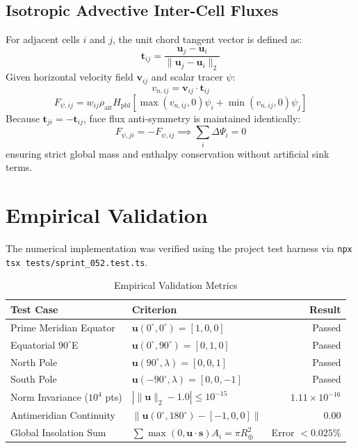 \documentclass[10pt,journal,compsoc]{IEEEtran}
\begin{document}
\subsection{Isotropic Advective Inter-Cell Fluxes}
For adjacent cells $i$ and $j$, the unit chord tangent vector is defined as:
\begin{equation}
\mathbf{t}_{ij} = \frac{\mathbf{u}_j - \mathbf{u}_i}{\|\mathbf{u}_j - \mathbf{u}_i\|_2}
\end{equation}
Given horizontal velocity field $\mathbf{v}_{ij}$ and scalar tracer $\psi$:
\begin{equation}
v_{n, ij} = \mathbf{v}_{ij} \cdot \mathbf{t}_{ij}
\end{equation}
\begin{equation}
F_{\psi, ij} = w_{ij} \rho_{\text{air}} H_{\text{pbl}} \left[ \max(v_{n, ij}, 0)\psi_i + \min(v_{n, ij}, 0)\psi_j \right]
\end{equation}
Because $\mathbf{t}_{ji} = -\mathbf{t}_{ij}$, face flux anti-symmetry is maintained identically:
\begin{equation}
F_{\psi, ji} = -F_{\psi, ij} \implies \sum_{i} \Delta \Psi_i = 0
\end{equation}
ensuring strict global mass and enthalpy conservation without artificial sink terms.

\section{Empirical Validation}
The numerical implementation was verified using the project test harness via \texttt{npx tsx tests/sprint\_052.test.ts}.

\begin{table}[htbp]
\caption{Empirical Validation Metrics}
\centering
\begin{tabular}{llr}
\toprule
\textbf{Test Case} & \textbf{Criterion} & \textbf{Result} \\
\midrule
Prime Meridian Equator & $\mathbf{u}(0^\circ, 0^\circ) = [1, 0, 0]$ & Passed \\
Equatorial $90^\circ$E & $\mathbf{u}(0^\circ, 90^\circ) = [0, 1, 0]$ & Passed \\
North Pole & $\mathbf{u}(90^\circ, \lambda) = [0, 0, 1]$ & Passed \\
South Pole & $\mathbf{u}(-90^\circ, \lambda) = [0, 0, -1]$ & Passed \\
Norm Invariance ($10^4$ pts) & $|\|\mathbf{u}\|_2 - 1.0| \le 10^{-15}$ & $1.11 \times 10^{-16}$ \\
Antimeridian Continuity & $\|\mathbf{u}(0^\circ, 180^\circ) - [-1, 0, 0]\|$ & $0.00$ \\
Global Insolation Sum & $\sum \max(0, \mathbf{u} \cdot \mathbf{s}) A_i = \pi R_\oplus^2$ & Error $< 0.025\%$ \\
\bottomrule
\end{tabular}
\label{tab:validation}
\end{table}
\end{document}
